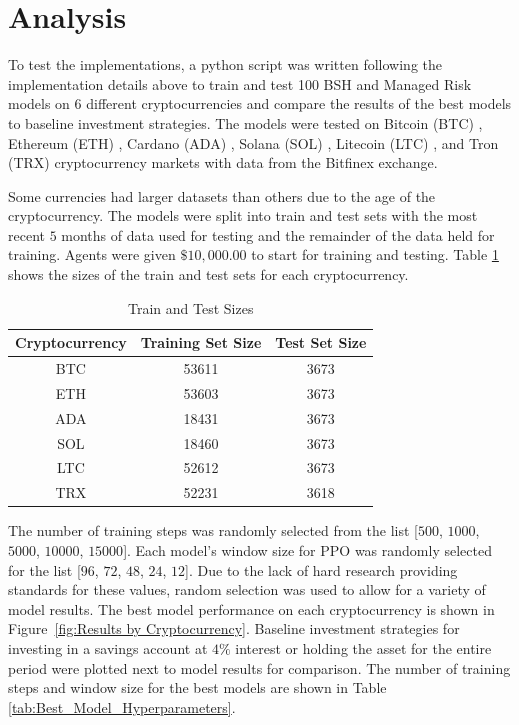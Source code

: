 \documentclass[journal]{new-aiaa}
\begin{document}
\section{Analysis}\label{sec:Analysis}
To test the implementations, a python script was written following the implementation details above to train and test 100 BSH and Managed Risk models on 6 different cryptocurrencies and compare the results of the best models to baseline investment strategies.
The models were tested on Bitcoin (BTC) \cite{nakamoto2008bitcoin}, Ethereum (ETH) \cite{buterin2013ethereum}, 
Cardano (ADA) \cite{cardano2024}, Solana (SOL) \cite{yakovenko2017solana}, Litecoin (LTC) \cite{lee2011litecoin}, and Tron (TRX) \cite{sun2017tron} cryptocurrency markets with data from the Bitfinex exchange.

Some currencies had larger datasets than others due to the age of the cryptocurrency.
The models were split into train and test sets with the most recent $5$ months of data used for testing and the remainder of the data held for training.
Agents were given $\$10,000.00$ to start for training and testing.
Table \ref{tab:Train_and_Test_Sizes} shows the sizes of the train and test sets for each cryptocurrency.

\begin{table}[hbt!]
        \centering
        \begin{tabular}{||c|c|c||}
                \hline
                \textbf{Cryptocurrency} & \textbf{Training Set Size} & \textbf{Test Set Size} \\
                \hline
                \hline
                BTC & 53611 & 3673 \\
                \hline
                ETH & 53603 & 3673 \\
                \hline
                ADA & 18431 & 3673 \\
                \hline
                SOL & 18460 & 3673 \\
                \hline
                LTC & 52612 & 3673 \\
                \hline
                TRX & 52231 & 3618 \\
                \hline
        \end{tabular}
        \caption{Train and Test Sizes}
        \label{tab:Train_and_Test_Sizes}
\end{table}

The number of training steps was randomly selected from the list [$500$, $1000$, $5000$, $10000$, $15000$].
Each model's window size for PPO was randomly selected for the list [$96$, $72$, $48$, $24$, $12$].
Due to the lack of hard research providing standards for these values, random selection was used to allow for a variety of model results.
The best model performance on each cryptocurrency is shown in Figure~\ref{fig:Results by Cryptocurrency}. 
Baseline investment strategies for investing in a savings account at $4\%$ interest or holding the asset for the entire period were plotted next to model results for comparison.
The number of training steps and window size for the best models are shown in Table \ref{tab:Best_Model_Hyperparameters}.
\end{document}
